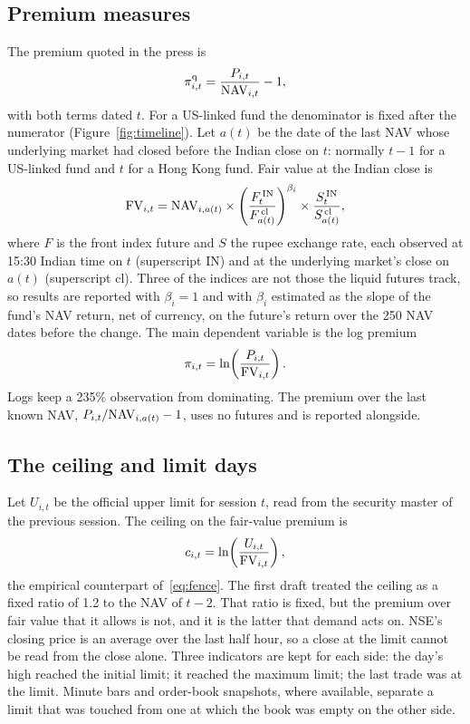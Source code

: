 \subsection{Premium measures}
The premium quoted in the press is
\begin{equation}\label{eq:raw}
\pi^{\mathrm{q}}_{i,t}=\frac{P_{i,t}}{\mathrm{NAV}_{i,t}}-1,
\end{equation}
with both terms dated $t$. For a US-linked fund the denominator is fixed after the numerator (Figure~\ref{fig:timeline}). Let $a(t)$ be the date of the last NAV whose underlying market had closed before the Indian close on $t$: normally $t-1$ for a US-linked fund and $t$ for a Hong Kong fund. Fair value at the Indian close is
\begin{equation}\label{eq:fv}
\mathrm{FV}_{i,t}=\mathrm{NAV}_{i,a(t)}\times\left(\frac{F^{\,\mathrm{IN}}_{t}}{F^{\,\mathrm{cl}}_{a(t)}}\right)^{\beta_i}\times\frac{S^{\,\mathrm{IN}}_{t}}{S^{\,\mathrm{cl}}_{a(t)}},
\end{equation}
where $F$ is the front index future and $S$ the rupee exchange rate, each observed at 15:30 Indian time on $t$ (superscript IN) and at the underlying market's close on $a(t)$ (superscript cl). Three of the indices are not those the liquid futures track, so results are reported with $\beta_i=1$ and with $\beta_i$ estimated as the slope of the fund's NAV return, net of currency, on the future's return over the 250 NAV dates before the change. The main dependent variable is the log premium
\begin{equation}\label{eq:pi}
\pi_{i,t}=\ln\!\left(\frac{P_{i,t}}{\mathrm{FV}_{i,t}}\right).
\end{equation}
Logs keep a 235\% observation from dominating. The premium over the last known NAV, $P_{i,t}/\mathrm{NAV}_{i,a(t)}-1$, uses no futures and is reported alongside.

\subsection{The ceiling and limit days}
Let $U_{i,t}$ be the official upper limit for session $t$, read from the security master of the previous session. The ceiling on the fair-value premium is
\begin{equation}\label{eq:cap}
c_{i,t}=\ln\!\left(\frac{U_{i,t}}{\mathrm{FV}_{i,t}}\right),
\end{equation}
the empirical counterpart of~\eqref{eq:fence}. The first draft treated the ceiling as a fixed ratio of 1.2 to the NAV of $t-2$. That ratio is fixed, but the premium over fair value that it allows is not, and it is the latter that demand acts on. NSE's closing price is an average over the last half hour, so a close at the limit cannot be read from the close alone. Three indicators are kept for each side: the day's high reached the initial limit; it reached the maximum limit; the last trade was at the limit. Minute bars and order-book snapshots, where available, separate a limit that was touched from one at which the book was empty on the other side.


